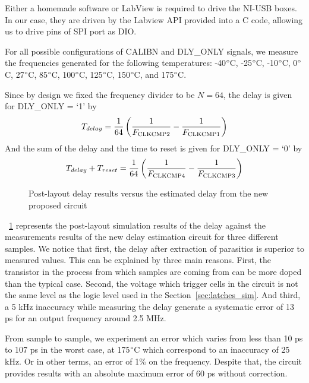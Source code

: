 Either a homemade software or LabView is required to drive the NI-USB boxes. In our case, they are driven by the Labview API provided into a C code, allowing us to drive pins of SPI port as DIO.

For all possible configurations of CALIBN and DLY\_ONLY signals, we measure the frequencies generated for the following temperatures: -40$\degree$C, -25$\degree$C, -10$\degree$C, 0$\degree$C, 27$\degree$C, 85$\degree$C, 100$\degree$C, 125$\degree$C, 150$\degree$C, and 175$\degree$C.

Since by design we fixed the frequency divider to be $N = 64$, the delay is given for DLY\_ONLY = `1' by
\begin{equation}
 T_{delay} = \frac{1}{64} \left(\frac{1}{F_{\rm CLKCMP2}}-\frac{1}{F_{\rm CLKCMP1}} \right)
\end{equation}
And the sum of the delay and the time to reset is given for DLY\_ONLY = `0' by
\begin{equation}
    T_{delay}+T_{reset} = \frac{1}{64} \left(\frac{1}{F_{\rm CLKCMP4}}-\frac{1}{F_{\rm CLKCMP3}} \right)
\end{equation}

\begin{figure}[htp]
    \centering
    
    \caption{Post-layout delay results versus the estimated delay from the new proposed circuit}
    \label{fig:delay_vs_meas}
\end{figure}

\figurename~\ref{fig:delay_vs_meas} represents the post-layout simulation results of the delay against the measurements results of the new delay estimation circuit for three different samples. We notice that first, the delay after extraction of parasitics is superior to measured values. This can be explained by three main reasons. First, the transistor in the process from which samples are coming from can be more doped than the typical case. Second, the voltage which trigger cells in the circuit is not the same level as the logic level used in the Section~\ref{sec:latches_sim}. And third, a 5 kHz inaccuracy while measuring the delay generate a systematic error of 13 ps for an output frequency around 2.5 MHz.

From sample to sample, we experiment an error which varies from less than 10 ps to 107 ps in the worst case, at 175\(\degree\)C which correspond to an inaccuracy of 25 kHz. Or in other terms, an error of 1\% on the frequency. Despite that, the circuit provides results with an absolute maximum error of 60 ps without correction.

